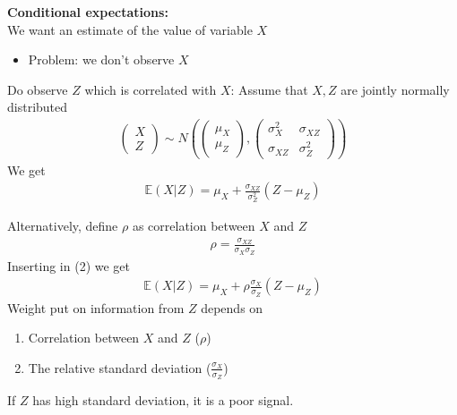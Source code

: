 \documentclass{beamer}
\begin{document}
\begin{frame}
  \textbf{Conditional expectations:}\\
   We want an estimate of the value of variable $X$ 
  \begin{itemize}
    \item Problem: we don't observe $X$
  \end{itemize}
  \medskip
  Do observe $Z$ which is correlated with $X$: Assume that $X,Z$ are jointly normally distributed
  \begin{align}
    \begin{pmatrix}      X \\Z     \end{pmatrix}
    \sim N \left ( \begin{pmatrix}      \mu_X \\ \mu_Z    \end{pmatrix},
    \begin{pmatrix}       \sigma^2_X & \sigma_{XZ} \\ \sigma_{XZ} & \sigma^2_Z     \end{pmatrix} \right )
  \end{align}  
  \medskip
  We get
  \begin{align}
    \mathbb{E}(X|Z) = \mu_X + \frac{\sigma_{XZ}}{\sigma^2_Z}(Z-\mu_Z)
  \end{align}
\end{frame}

\begin{frame}
  Alternatively, define $\rho$ as correlation between $X$ and $Z$
  \begin{align}
    \rho= \frac{\sigma_{XZ}}{\sigma_X \sigma_Z}
  \end{align}
  Inserting in (2) we get
  \begin{align}
    \mathbb{E}(X|Z) = \mu_X + \rho \frac{\sigma_X}{\sigma_Z}(Z-\mu_Z)
  \end{align}
  \medskip
  Weight put on information from $Z$ depends on
  \begin{enumerate}
    \item Correlation between $X$ and $Z$ ($\rho$)
    \item The relative standard deviation ($\frac{\sigma_X}{\sigma_Z}$)
  \end{enumerate}
  If $Z$ has high standard deviation, it is a poor signal.
\end{frame}
\end{document}
